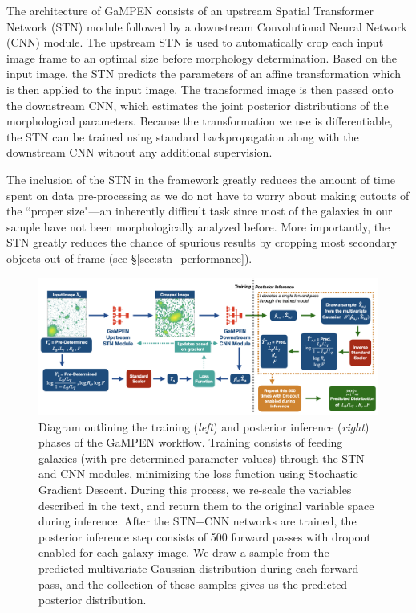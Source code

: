 \documentclass[linenumbers,twocolumn,twocolappendix]{aastex631}
\newcommand\gampen{GaMPEN}
\begin{document}
\begin{CJK*}{UTF8}{gbsn}
The architecture of \gampen{} consists of an upstream Spatial Transformer Network (STN) module followed by a downstream Convolutional Neural Network (CNN) module. The upstream STN is used to automatically crop each input image frame to an optimal size before morphology determination. Based on the input image, the STN predicts the parameters of an affine transformation which is then applied to the input image. The transformed image is then passed onto the downstream CNN, which estimates the joint posterior distributions of the morphological parameters. Because the transformation we use is differentiable, the STN can be trained using standard backpropagation along with the downstream CNN without any additional supervision.

The inclusion of the STN in the framework greatly reduces the amount of time spent on data pre-processing as we do not have to worry about making cutouts of the ``proper size"---an inherently difficult task since most of the galaxies in our sample have not been morphologically analyzed before. More importantly, the STN greatly reduces the chance of spurious results by cropping most secondary objects out of frame (see \S \ref{sec:stn_performance}).

\begin{figure}[htb]
    \centering
    \includegraphics[width
    =\textwidth]{posterior_pred_workflow.png}
    \caption{Diagram outlining the training (\textit{left}) and posterior inference (\textit{right}) phases of the \gampen{} workflow. Training consists of feeding galaxies (with pre-determined parameter values) through the STN and CNN modules, minimizing the loss function using Stochastic Gradient Descent. 
    During this process, we re-scale the variables described in the text, and return them to the original variable space during inference.
    After the STN+CNN networks are trained, the posterior inference step consists of 500 forward passes with dropout enabled for each galaxy image. We draw a sample from the predicted multivariate Gaussian distribution during each forward pass, and the collection of these samples gives us the predicted posterior distribution.}
    \label{fig:posterior_pred_workflow}
\end{figure}


\end{CJK*}
\end{document}
